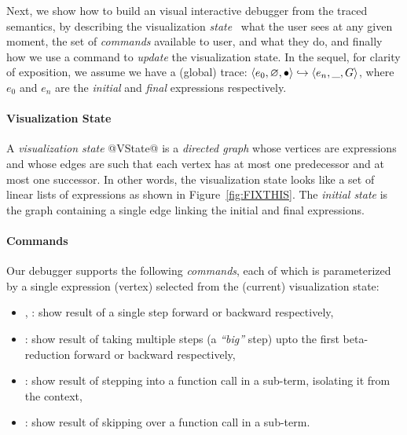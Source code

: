 Next, we show how to build an visual interactive debugger
from the traced semantics, by describing the visualization
\emph{state} \ie\ what the user sees at any given moment,
the set of \emph{commands} available to user, and what
they do, and finally how we use a command to \emph{update}
the visualization state. In the sequel, for clarity of
exposition, we assume we have a (global) trace:
$\langle e_0, \varnothing, \bullet \rangle \hookrightarrow \langle e_n, \_, G \rangle$, where
$e_0$ and $e_n$ are the \emph{initial} and \emph{final}
expressions respectively.

\paragraph{Visualization State}
%
A \emph{visualization state} @VState@ is a \emph{directed graph}
whose vertices are expressions and whose edges are such
that each vertex has at most one predecessor and at most one
successor. In other words, the visualization state looks
like a set of linear lists of expressions as shown in Figure~\ref{fig:FIXTHIS}.
%
The \emph{initial state} is the graph containing a single
edge linking the initial and final expressions.

\paragraph{Commands}
Our debugger supports the following \emph{commands}, each of which
is parameterized by a single expression (vertex) selected from the
(current) visualization state:
%
\begin{itemize}
%
\item \stepforwardsym, \stepbackwardsym:
      show result of a single step forward or backward respectively,
%
\item \jumpforwardsym:
      show result of taking multiple steps (a \emph{``big''} step)
      upto the first beta-reduction forward or backward respectively,
%
\item \stepintosym:
      show result of stepping into a function call in a sub-term,
      isolating it from the context,

\item \stepoversym:
      show result of skipping over a function call in a sub-term.
\end{itemize}



